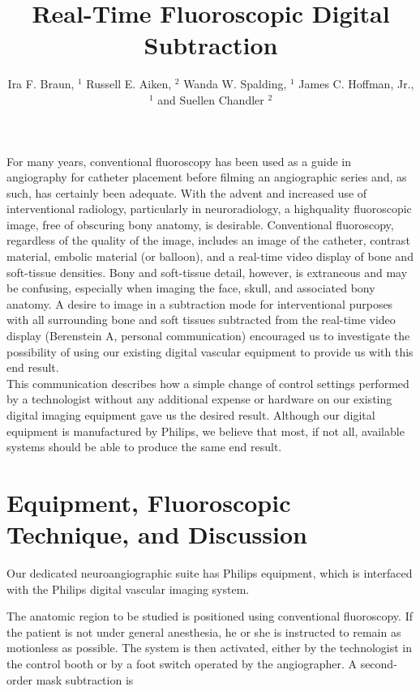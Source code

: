 \documentclass[10pt]{article}
\title{Real-Time Fluoroscopic Digital Subtraction }
\author{Ira F. Braun, ${ }^{1}$ Russell E. Aiken, ${ }^{2}$ Wanda W. Spalding, ${ }^{1}$ James C. Hoffman, Jr., ${ }^{1}$ and Suellen Chandler ${ }^{2}$}
\date{}
\begin{document}
\maketitle
For many years, conventional fluoroscopy has been used as a guide in angiography for catheter placement before filming an angiographic series and, as such, has certainly been adequate. With the advent and increased use of interventional radiology, particularly in neuroradiology, a highquality fluoroscopic image, free of obscuring bony anatomy, is desirable. Conventional fluoroscopy, regardless of the quality of the image, includes an image of the catheter, contrast material, embolic material (or balloon), and a real-time video display of bone and soft-tissue densities. Bony and soft-tissue detail, however, is extraneous and may be confusing, especially when imaging the face, skull, and associated bony anatomy. A desire to image in a subtraction mode for interventional purposes with all surrounding bone and soft tissues subtracted from the real-time video display (Berenstein A, personal communication) encouraged us to investigate the possibility of using our existing digital vascular equipment to provide us with this end result.\\
This communication describes how a simple change of control settings performed by a technologist without any additional expense or hardware on our existing digital imaging equipment gave us the desired result. Although our digital equipment is manufactured by Philips, we believe that most, if not all, available systems should be able to produce the same end result.

\section*{Equipment, Fluoroscopic Technique, and Discussion}
Our dedicated neuroangiographic suite has Philips equipment, which is interfaced with the Philips digital vascular imaging system.

The anatomic region to be studied is positioned using conventional fluoroscopy. If the patient is not under general anesthesia, he or she is instructed to remain as motionless as possible. The system is then activated, either by the technologist in the control booth or by a foot switch operated by the angiographer. A second-order mask subtraction is
\end{document}
